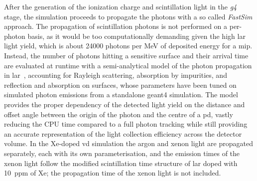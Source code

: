 After the generation of the ionization charge and scintillation light in the \emph{g4} stage, the simulation proceeds to propagate the photons with a so called \emph{FastSim} approach. The propagation of scintillation photons is not performed on a per-photon basis, as it would be too computationally demanding given the high \gls{lar} light yield, which is about \num{24000} photons per MeV of deposited energy for a \gls{mip}. Instead, the number of photons hitting a sensitive surface and their arrival time are evaluated at runtime with a semi-analytical model of the photon propagation in \gls{lar}~\cite{semiana}, accounting for Rayleigh scattering, absorption by impurities, and reflection and absorption on surfaces, whose parameters have been tuned on simulated photon emissions from a standalone \gls{geant4} simulation. The model provides the proper dependency of the detected light yield on the distance and offset angle between the origin of the photon and the centre of a \gls{pd}, vastly reducing the CPU time compared to a full photon tracking while still providing an accurate representation of the light collection efficiency across the detector volume. In the Xe-doped \gls{vd} simulation the argon and xenon light are propagated separately, each with its own parameterisation, and the emission times of the xenon light follow the modified scintillation time structure of \gls{lar} doped with 10~ppm of Xe; the propagation time of the xenon light is not included.
